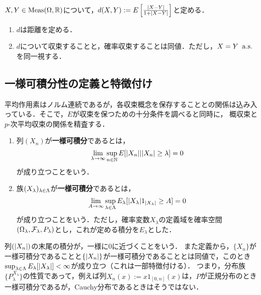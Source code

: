 \documentclass[uplatex,dvipdfmx]{jsreport}
\begin{document}
\begin{proposition}[確率収束を定める距離]
    $X,Y\in\mathrm{Meas}(\Omega,\mathbb{R})$について，$d(X,Y):=E\left[\frac{\lvert X-Y\rvert}{1+\lvert X-Y\rvert}\right]$と定める．
    \begin{enumerate}
        \item $d$は距離を定める．
        \item $d$について収束することと，確率収束することは同値．ただし，$X=Y\;\;\mathrm{a.s.}$を同一視する．
    \end{enumerate}
\end{proposition}

\subsection{一様可積分性の定義と特徴付け}

\begin{tcolorbox}[colframe=ForestGreen, colback=ForestGreen!10!white,breakable,colbacktitle=ForestGreen!40!white,coltitle=black,fonttitle=\bfseries\sffamily,
title=]
    平均作用素はノルム連続であるが，各収束概念を保存することとの関係は込み入っている．そこで，$E$が収束を保つための十分条件を調べると同時に，
    概収束と$p$-次平均収束の関係を精査する．
\end{tcolorbox}

\begin{definition}\mbox{}
    \begin{enumerate}
        \item 列$(X_n)$が\textbf{一様可積分}であるとは，
        \[\lim_{\lambda\to\infty}\sup_{n\in\mathbb{N}}E[\lvert X_n\rvert|\lvert X_n\rvert\ge\lambda]=0\]
        が成り立つことをいう．
        \item 族$(X_\lambda)_{\lambda\in\Lambda}$が\textbf{一様可積分}であるとは，
        \[\lim_{A\to\infty}\sup_{\lambda\in\Lambda}E_\lambda[\lvert X_\lambda\rvert1_{\lvert X_\lambda\rvert}\ge A]=0\]
        が成り立つことをいう．ただし，確率変数$X_\lambda$の定義域を確率空間$(\Omega_\lambda,\mathcal{F}_\lambda,P_\lambda)$とし，これが定める積分を$E_\lambda$とした．
    \end{enumerate}
\end{definition}
\begin{remarks}
    列$(\lvert X_n\rvert)$の末尾の積分が，一様に$0$に近づくことをいう．
    また定義から，$\{X_n\}$が一様可積分であることと$\{\lvert X_n\rvert\}$が一様可積分であることとは同値で，このとき$\sup_{\lambda\in\Lambda}E_\lambda[\lvert X_\lambda\rvert]<\infty$が成り立つ（これは一部特徴付ける）．
    つまり，分布族$\{P^{X_\lambda}_\lambda\}$の性質であって，例えば列$X_n(x):=x1_{[0,n]}(x)$は，$P$が正規分布のとき一様可積分であるが，Cauchy分布であるときはそうではない．
\end{remarks}
\end{document}

